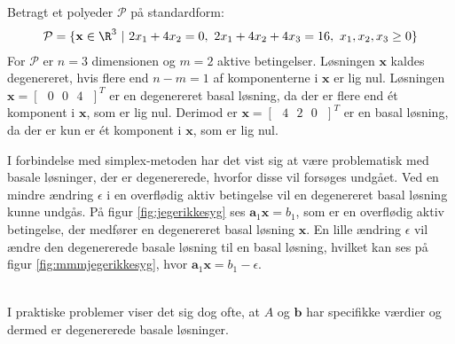 \begin{eks}{}{}
%
%
Betragt et polyeder $\mathcal{P}$ på standardform: 
%
\begin{align*}
\mathcal{P} = \{ 
\mathbf{x} \in \R^3 \text{  } | 
\text{  } 2 x_1 + 4 x_2 = 0, 
\text{  } 2 x_1 + 4 x_2 + 4 x_3 = 16, 
\text{  } x_1 , x_2, x_3 \geq 0 \}
\end{align*}
%
For $\mathcal{P}$ er $n=3$ dimensionen og $m=2$ aktive betingelser. 
Løsningen $\mathbf{x}$ kaldes degenereret, hvis flere end $n-m=1$ af komponenterne i $\mathbf{x}$ er lig nul.
Løsningen $\mathbf{x}= [ \text{ } 0 \text{  } 0 \text{  } 4 \text{ } ]^T $ er en degenereret basal løsning, da der er flere end ét komponent i $\mathbf{x}$, som er lig nul. 
Derimod er  $\mathbf{x}= [ \text{ } 4 \text{  } 2 \text{  } 0 \text{ } ]^T $ er en basal løsning, da der er kun er ét komponent i $\mathbf{x}$, som er lig nul. 
%
\end{eks}
% 
%
%
I forbindelse med simplex-metoden har det vist sig at være problematisk med basale løsninger, der er degenererede, hvorfor disse vil forsøges undgået.
Ved en mindre ændring $\epsilon$ i en overflødig aktiv betingelse vil en degenereret basal løsning kunne undgås. 
På figur \ref{fig:jegerikkesyg} ses $\mathbf{a}_1 \mathbf{x} = b_1$, som er en overflødig aktiv betingelse, der medfører en degenereret basal løsning $\mathbf{x}$.
En lille ændring $\epsilon$ vil ændre den degenererede basale løsning til en basal løsning, hvilket kan ses på figur \ref{fig:mmmjegerikkesyg}, hvor $\mathbf{a}_1 \mathbf{x} = b_1 - \epsilon$.
%
%
\begin{center}
$
\begin{array}{cc}
&

\end{array}
$
\end{center}
%
%
I praktiske problemer viser det sig dog ofte, at $A$ og $\mathbf{b}$ har specifikke værdier og dermed er degenererede basale løsninger.
%